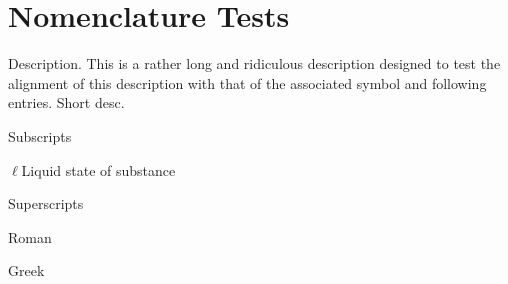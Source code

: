 
\chapter{Nomenclature Tests}

\MakeNomenclatureNotStarred
{}
\begin{Nomenclature}[section]
      {Description. This is a rather long and ridiculous description designed to test the alignment of 
                 this description with that of the associated symbol and following entries.}
        {Short desc.}

    \begin{Group}{Subscripts} %
        \item{$\ell$}{Liquid state of substance}
    \end{Group}
    \begin{Group}{Superscripts} %
    \end{Group}
    \begin{Group}{Roman} %
    \end{Group}
    \begin{Group}{Greek} %
        \begin{Group}{} %
            \Show\TheNomenGroupName
        \end{Group}
        \begin{Group}{} %
        \end{Group}
    \end{Group}
\end{Nomenclature}

